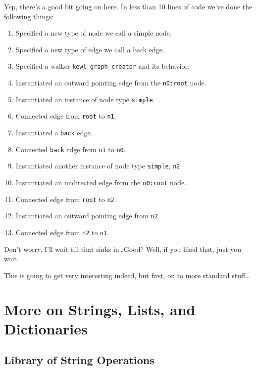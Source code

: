 Yep, there's a good bit going on here. In less than 10 lines of code we've done the following things:
\begin{enumerate}[itemsep=0mm]
    \footnotesize
    \item Specified a new type of node we call a simple node.
    \item Specified a new type of edge we call a back edge.
    \item Specified a walker \texttt{kewl\_graph\_creator} and its behavior.
    \item Instantiated an outward pointing edge from the \texttt{n0:root} node.
    \item Instantiated an instance of node type \texttt{simple}.
    \item Connected edge from \texttt{root} to \texttt{n1}.
    \item Instantiated a \texttt{back} edge.
    \item Connected \texttt{back} edge from \texttt{n1} to \texttt{n0}.
    \item Instantiated another instance of node type \texttt{simple}, \texttt{n2}.
    \item Instantiated an undirected edge from the \texttt{n0:root} node.
    \item Connected edge from \texttt{root} to \texttt{n2}.
    \item Instantiated an outward pointing edge from \texttt{n2}.
    \item Connected edge from \texttt{n2} to \texttt{n1}.
\end{enumerate}

Don't worry, I'll wait till that sinks in\dots Good? Well, if you liked that, just you wait.
\par
This is going to get very interesting indeed, but first, on to more standard stuff\dots




\section{More on Strings, Lists, and Dictionaries}
\par
{}
\par
{}
\subsection{Library of String Operations}
\printtabStrOps
